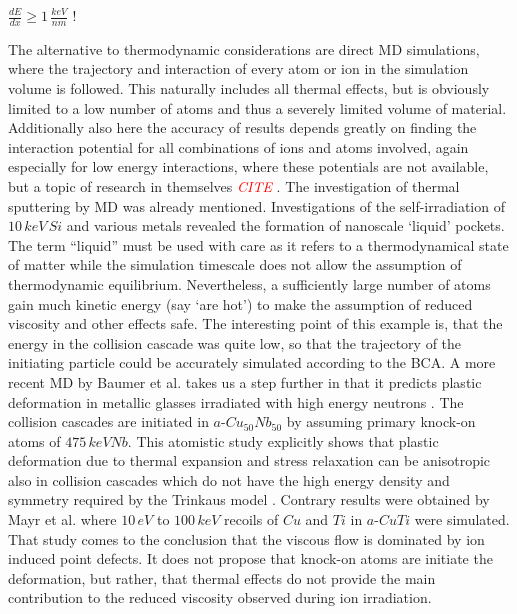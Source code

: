 \documentclass[12pt,
paper=a4,				
DIV=calc,		  %
BCOR=16mm,	  %
headinclude,
openany
]{scrbook}
\newcommand{\TODO}[1]{{\LARGE{\textcolor{red}{\emph {#1 }}}}}
\begin{document}
$\frac{dE}{dx} \geq 1\,\frac{keV}{nm}$ \cite{trinkaus_viscoelastic_1995}!

The alternative to thermodynamic considerations are direct MD simulations, where the trajectory and interaction of every atom or ion in the simulation volume is followed. This naturally includes all thermal effects, but is obviously limited to a low number of atoms and thus a severely limited volume of material. Additionally also here the accuracy of results depends greatly on finding the interaction potential for all combinations of ions and atoms involved, again especially for low energy interactions, where these potentials are not available, but a topic of research in themselves \TODO{CITE}. The investigation of thermal sputtering by MD was already mentioned. Investigations of the self-irradiation of $10\,keV\,Si$ and various metals \cite{nordlund_defect_1998} revealed the formation of nanoscale `liquid' pockets. The term ``liquid'' must be used with care as it refers to a thermodynamical state of matter while the simulation timescale does not allow the assumption of thermodynamic equilibrium. Nevertheless, a sufficiently large number of atoms gain much kinetic energy (say `are hot') to make the assumption of reduced viscosity and other effects safe. The interesting point of this example is, that the energy in the collision cascade was quite low, so that the trajectory of the initiating particle could be accurately simulated according to the BCA. A more recent MD by Baumer et al. takes us a step further in that it predicts plastic deformation in metallic glasses irradiated with high energy neutrons \cite{baumer_prediction_2014}. The collision cascades are initiated in $a$-$Cu_{50}Nb_{50}$ by assuming primary knock-on atoms of $475\,keV Nb$. This atomistic study explicitly shows that plastic deformation due to thermal expansion and stress relaxation can be anisotropic also in collision cascades which do not have the high energy density and symmetry required by the Trinkaus model \cite{trinkaus_viscoelastic_1995}. Contrary results were obtained by Mayr et al. \cite{mayr_mechanisms_2003} where $10\,eV$ to $100\,keV$ recoils of $Cu$ and $Ti$ in $a$-$CuTi$ were simulated. That study comes to the conclusion that the viscous flow is dominated by ion induced point defects. It does not propose that knock-on atoms are initiate the deformation, but rather, that thermal effects do not provide the main contribution to the reduced viscosity observed during ion irradiation.
\end{document}
